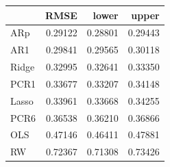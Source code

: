\begin{tabular}{lrrr}
\toprule
 & RMSE & lower & upper \\
\midrule
ARp & 0.29122 & 0.28801 & 0.29443 \\
AR1 & 0.29841 & 0.29565 & 0.30118 \\
Ridge & 0.32995 & 0.32641 & 0.33350 \\
PCR1 & 0.33677 & 0.33207 & 0.34148 \\
Lasso & 0.33961 & 0.33668 & 0.34255 \\
PCR6 & 0.36538 & 0.36210 & 0.36866 \\
OLS & 0.47146 & 0.46411 & 0.47881 \\
RW & 0.72367 & 0.71308 & 0.73426 \\
\bottomrule
\end{tabular}
